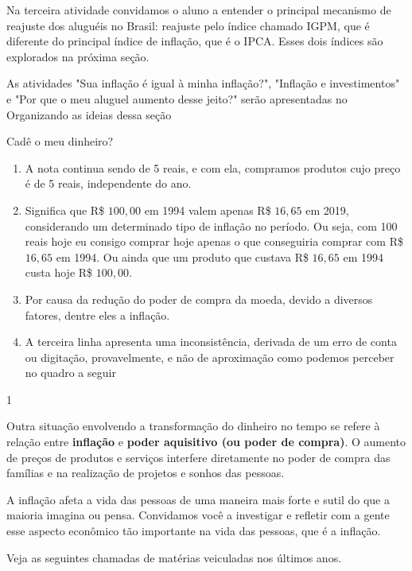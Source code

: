 \begin{texto}
{  Na terceira atividade convidamos o aluno a entender o principal mecanismo de reajuste dos aluguéis no Brasil: reajuste pelo índice chamado IGPM, que é diferente do principal índice de inflação, que é o IPCA. Esses dois índices são explorados na próxima seção. 

  As atividades "Sua inflação é igual à minha inflação?", "Inflação e investimentos"{} e "Por que o meu aluguel aumento desse jeito?"{} serão apresentadas no Organizando as ideias dessa seção

}
\end{texto}
\clearmargin
\marginpar{\vspace{.5em}}
\begin{answer}{Cadê o meu dinheiro?}
{
\begin{enumerate}
\item A nota continua sendo de 5 reais, e com ela, compramos produtos cujo preço é de 5 reais, independente do ano.
\item Significa que R\$ $100{,}00$ em 1994 valem apenas R\$ $16{,}65$ em 2019, considerando um determinado tipo de inflação no período. Ou seja, com 100 reais hoje eu consigo comprar hoje apenas o que conseguiria comprar com R\$ $16{,}65$ em 1994. Ou ainda que um produto que custava R\$ $16{,}65$ em 1994 custa hoje R\$ $100{,}00$. 
\item Por causa da redução do poder de compra da moeda, devido a diversos fatores, dentre eles a inflação.
\item A terceira linha apresenta uma inconsistência, derivada de um erro de conta ou digitação, provavelmente, e não de aproximação como podemos perceber no quadro a seguir
\end{enumerate}

}{1}
\end{answer}
\label{fin-exp-7}

Outra situação envolvendo a transformação do dinheiro no tempo se refere à relação entre \textbf{inflação} e \textbf{poder aquisitivo (ou poder de compra)}. O aumento de preços de produtos e serviços interfere diretamente no poder de compra das famílias e na realização de projetos e sonhos das pessoas.

A inflação afeta a vida das pessoas de uma maneira mais forte e sutil do que a maioria imagina ou pensa. Convidamos você a investigar e refletir com a gente esse aspecto econômico tão importante na vida das pessoas, que é a inflação.

Veja as seguintes chamadas de matérias veiculadas nos últimos anos.

